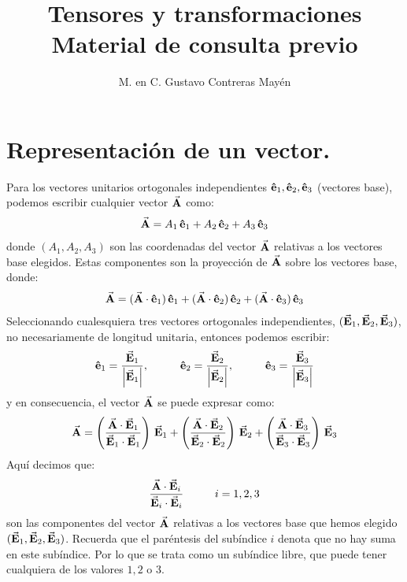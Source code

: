 \documentclass[hidelinks,12pt]{article}
\title{Tensores y transformaciones \\ \large{Material de consulta previo}\vspace{-3ex}}
\author{M. en C. Gustavo Contreras Mayén}
\date{ }
\begin{document}
\vspace{-4cm}
\maketitle
\fontsize{14}{14}\selectfont
\tableofcontents
\newpage


\section{Representación de un vector.}

Para los vectores unitarios ortogonales independientes $\vu{e}_{1}, \vu{e}_2, \vu{e}_{3}$ (vectores base), podemos escribir cualquier vector $\va{A}$ como:
\begin{align*}
\va{A} = A_{1} \, \vu{e}_{1} + A_{2} \, \vu{e}_{2} + A_{3} \, \vu{e}_{3}
\end{align*}
donde $(A_{1}, A_{2}, A_{3})$ son las coordenadas del vector $\va{A}$ relativas a los vectores base elegidos. Estas componentes son la proyección de $\va{A}$ sobre los vectores base, donde:
\begin{align*}
\va{A} = (\va{A} \cdot \vu{e}_{1}) \, \vu{e}_{1} + (\va{A} \cdot \vu{e}_{2}) \, \vu{e}_{2} + (\va{A} \cdot \vu{e}_{3}) \, \vu{e}_{3}
\end{align*}
Seleccionando cualesquiera tres vectores ortogonales independientes, \hfill \break $(\va{E}_{1}, \va{E}_{2}, \va{E}_{3})$, no necesariamente de longitud unitaria, entonces podemos escribir:
\begin{align*}
\vu{e}_{1} = \dfrac{\va{E}_{1}}{\abs{\va{E}_{1}}}, \hspace{1cm} \vu{e}_{2} = \dfrac{\va{E}_{2}}{\abs{\va{E}_{2}}}, \hspace{1cm} \vu{e}_{3} = \dfrac{\va{E}_{3}}{\abs{\va{E}_{3}}}
\end{align*}
y en consecuencia, el vector $\va{A}$ se puede expresar como:
\begin{align*}
\va{A} = \left( \dfrac{\va{A} \cdot \va{E}_{1}}{\va{E}_{1} \cdot \va{E}_{1}} \right) \, \va{E}_{1} + \left( \dfrac{\va{A} \cdot \va{E}_{2}}{\va{E}_{2} \cdot \va{E}_{2}} \right) \, \va{E}_{2} + \left( \dfrac{\va{A} \cdot \va{E}_{3}}{\va{E}_{3} \cdot \va{E}_{3}} \right) \, \va{E}_{3} 
\end{align*}
Aquí decimos que:
\begin{align*}
\dfrac{\va{A} \cdot \va{E}_{i}}{\va{E}_{i} \cdot \va{E}_{i}} \hspace{1cm} i = 1, 2, 3
\end{align*}
son las componentes del vector $\va{A}$ relativas a los vectores base que hemos elegido $(\va{E}_{1}, \va{E}_{2}, \va{E}_{3})$. Recuerda que el paréntesis del subíndice $i$ denota que no hay suma en este subíndice. Por lo que se trata como un subíndice libre, que puede tener cualquiera de los valores $1, 2$ o $3$.
\end{document}
